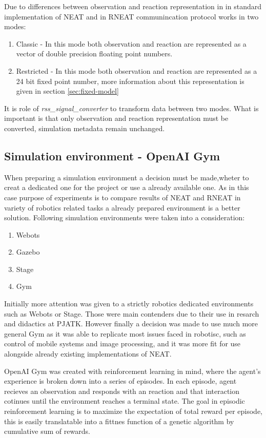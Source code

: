 Due to differences between observation and reaction representation in in standard implementation
of NEAT and in RNEAT communincation protocol works in two modes:
\begin{enumerate}
	\item Classic - In this mode both observation and reaction are represented as a vector
		of double precision floating point numbers.
	\item Restricted - In this mode both observation and reaction are represented as a 
		24 bit fixed point number, more information about this representation is given in
		section \ref{sec:fixed-model}
\end{enumerate}
It is role of \textit{rss\_signal\_converter} to transform data between two modes. What is 
important is that only observation and reaction representation must be converted, simulation
metadata remain unchanged.
\FloatBarrier
\subsection{Simulation environment - OpenAI Gym}
When preparing a simulation environment a decision must be made,wheter to creat a dedicated one
for the project or use a already available one.
As in this case purpose of experiments is to compare results of NEAT and RNEAT in variety of 
robotics related tasks a already prepared environment is a better solution.
Following simulation environments were taken into a consideration:
\begin{enumerate}
	\item Webots
	\item Gazebo
	\item Stage
	\item Gym
\end{enumerate}
Initially more attention was given to a strictly robotics dedicated environments such as 
Webots or Stage. Those were main contenders due to their use in resarch and didactics at PJATK.
However finally a decision was made to use much more general Gym as it was able to replicate
most issues faced in robotisc, such as control of mobile systems and image processing, and it
was more fit for use alongside already existing implementations of NEAT.

OpenAI Gym was created with reinforcement learning in mind, where the agent’s experience is broken
down into a series of episodes. 
In each episode, agent recieves an observation and responds with an reaction and that 
interaction cotinues until the environment reaches a terminal state. 
The goal in episodic reinforcement learning is to maximize the expectation of total reward per 
episode, this is easily translatable into a fittnes function of a genetic algorithm by cumulative
sum of rewards.

